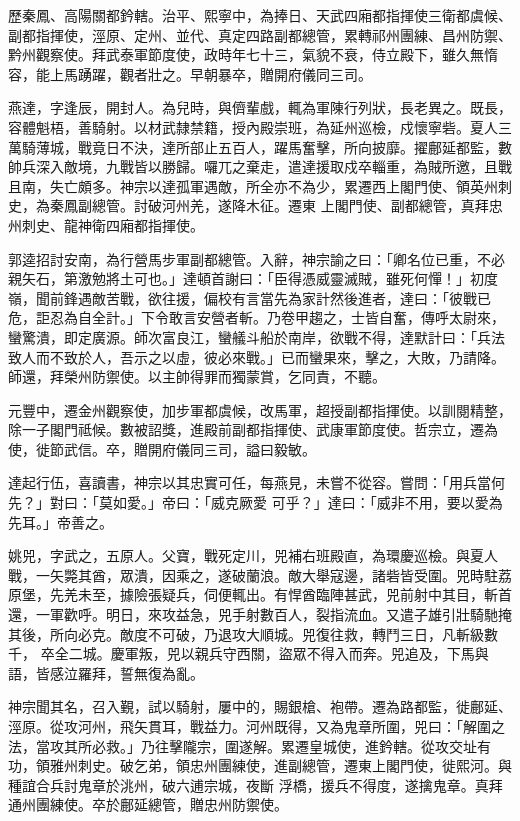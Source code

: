 \begin{pinyinscope}
 歷秦鳳、高陽關都鈐轄。治平、熙寧中，為捧日、天武四廂都指揮使三衛都虞候、副都指揮使，涇原、定州、並代、真定四路副都總管，累轉祁州團練、昌州防禦、黔州觀察使。拜武泰軍節度使，政時年七十三，氣貌不衰，侍立殿下，雖久無惰容，能上馬踴躍，觀者壯之。早朝暴卒，贈開府儀同三司。



 燕達，字逢辰，開封人。為兒時，與儕輩戲，輒為軍陳行列狀，長老異之。既長，容體魁梧，善騎射。以材武隸禁籍，授內殿崇班，為延州巡檢，戍懷寧砦。夏人三萬騎薄城，戰竟日不決，達所部止五百人，躍馬奮擊，所向披靡。擢鄜延都監，數帥兵深入敵境，九戰皆以勝歸。囉兀之棄走，遣達援取戍卒輜重，為賊所邀，且戰且南，失亡頗多。神宗以達孤軍遇敵，所全亦不為少，累遷西上閣門使、領英州刺史，為秦鳳副總管。討破河州羌，遂降木征。遷東
 上閣門使、副都總管，真拜忠州刺史、龍神衛四廂都指揮使。



 郭逵招討安南，為行營馬步軍副都總管。入辭，神宗諭之曰：「卿名位已重，不必親矢石，第激勉將土可也。」達頓首謝曰：「臣得憑威靈滅賊，雖死何憚！」初度嶺，聞前鋒遇敵苦戰，欲往援，偏校有言當先為家計然後進者，達曰：「彼戰已危，詎忍為自全計。」下令敢言安營者斬。乃卷甲趨之，士皆自奮，傳呼太尉來，蠻驚潰，即定廣源。師次富良江，蠻艤斗船於南岸，欲戰不得，達默計曰：「兵法
 致人而不致於人，吾示之以虛，彼必來戰。」已而蠻果來，擊之，大敗，乃請降。師還，拜榮州防禦使。以主帥得罪而獨蒙賞，乞同責，不聽。



 元豐中，遷金州觀察使，加步軍都虞候，改馬軍，超授副都指揮使。以訓閱精整，除一子閣門祗候。數被詔獎，進殿前副都指揮使、武康軍節度使。哲宗立，遷為使，徙節武信。卒，贈開府儀同三司，謚曰毅敏。



 達起行伍，喜讀書，神宗以其忠實可任，每燕見，未嘗不從容。嘗問：「用兵當何先？」對曰：「莫如愛。」帝曰：「威克厥愛
 可乎？」達曰：「威非不用，要以愛為先耳。」帝善之。



 姚兕，字武之，五原人。父寶，戰死定川，兕補右班殿直，為環慶巡檢。與夏人戰，一矢斃其酋，眾潰，因乘之，遂破蘭浪。敵大舉寇邊，諸砦皆受圍。兕時駐荔原堡，先羌未至，據險張疑兵，伺便輒出。有悍酋臨陣甚武，兕前射中其目，斬首還，一軍歡呼。明日，來攻益急，兕手射數百人，裂指流血。又遣子雄引壯騎馳掩其後，所向必克。敵度不可破，乃退攻大順城。兕復往救，轉鬥三日，凡斬級數千，
 卒全二城。慶軍叛，兕以親兵守西關，盜眾不得入而奔。兕追及，下馬與語，皆感泣羅拜，誓無復為亂。



 神宗聞其名，召入覲，試以騎射，屢中的，賜銀槍、袍帶。遷為路都監，徙鄜延、涇原。從攻河州，飛矢貫耳，戰益力。河州既得，又為鬼章所圍，兕曰：「解圍之法，當攻其所必救。」乃往擊隴宗，圍遂解。累遷皇城使，進鈐轄。從攻交址有功，領雅州刺史。破乞弟，領忠州團練使，進副總管，遷東上閣門使，徙熙河。與種誼合兵討鬼章於洮州，破六逋宗城，夜斷
 浮橋，援兵不得度，遂擒鬼章。真拜通州團練使。卒於鄜延總管，贈忠州防禦使。




\end{pinyinscope}
